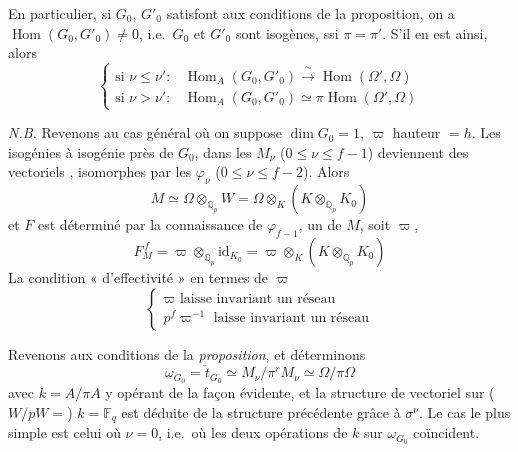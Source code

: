 \documentclass[11pt,a4paper]{article}
\begin{document}


En particulier, si $G_0$, $G'_0$ satisfont aux conditions de la
proposition, on a $\operatorname{Hom}(G_0, G'_0) \neq 0$, i.e.\ $G_0$ et
$G'_0$ sont isogènes, ssi $\pi = \pi'$. \struck{\ill{}} S'il en est ainsi,
alors \struck{\ill{}}
\[
\begin{cases}
\text{si } \nu \le \nu' : & \operatorname{Hom}_A(G_0, G'_0) \xrightarrow{\ \sim\ } \operatorname{Hom}(\Omega', \Omega) \\
\text{si } \nu > \nu' : & \operatorname{Hom}_A(G_0, G'_0) \simeq \pi \operatorname{Hom}(\Omega', \Omega)
\end{cases}
\]

\emph{N.B.} Revenons au cas général où on  suppose
 $\dim G_0 = 1$, \ill{} $\varpi$ \ill{} hauteur $= h$.
Les isogénies à isogénie près \struck{\ill{}} de $G_0$, dans les $M_\nu$
($0 \le \nu \le f-1$) deviennent des vectoriels 
, isomorphes par les $\varphi_\nu$ ($0 \le \nu \le f-2$).
Alors \struck{\ill{}}
\[
M \simeq \Omega \otimes_{\mathbb{Q}_p} W = \Omega \otimes_K (K \otimes_{\mathbb{Q}_p} K_0)
\]
et $F$ est déterminé par la connaissance de $\varphi_{f-1}$, \ill{} un
\ill{} de $M$, soit $\varpi$, \ill{} \ill{} \ill{}
\[
F_M^{\,f} = \varpi \otimes_{\mathbb{Q}_p} \mathrm{id}_{K_0} = \varpi \otimes_K (K \otimes_{\mathbb{Q}_p} K_0)
\]
La condition « d'effectivité »  en termes de
$\varpi$ \ill{}
\[
\begin{cases}
\varpi \text{ laisse invariant un réseau} \\
p^{f} \varpi^{-1} \text{ laisse invariant un réseau}
\end{cases}
\]


Revenons aux conditions de la \emph{proposition}, et déterminons
\[
\omega_{G_0} = \check{t}_{G_0} \simeq M_\nu / \pi^{r} M_\nu \simeq \Omega / \pi \Omega
\]
avec $k = A/\pi A$ y opérant de la façon évidente, et la structure de
vectoriel sur ($W/pW =$) $k = \mathbb{F}_q$ est déduite de la structure
précédente grâce à $\sigma^\nu$. Le cas le plus simple est celui où
$\nu = 0$, i.e.\ où \struck{\ill{}} les deux opérations de $k$ sur
$\omega_{G_0}$ coïncident. \struck{\ill{}} 
\end{document}
